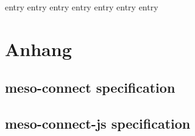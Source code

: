 \documentclass[headsepline,footsepline,footinclude=false,oneside,fontsize=11pt,paper=a4,listof=totoc,bibliography=totoc]{scrbook} %
\begin{document}
\renewcommand*\abstractname{Zusammenfassung/Abstract}



\frontmatter{}




\tableofcontents{}

\mainmatter{}

{entry}
{entry}
{entry}
{entry}
{entry}
{entry}
{entry}

\appendix{}

\listoffigures{}
\printbibliography{}

\chapter{Anhang}

\section{meso-connect specification}
\label{app:meso-connect}




\section{meso-connect-js specification}
\label{app:meso-connect-js}

\end{document}
